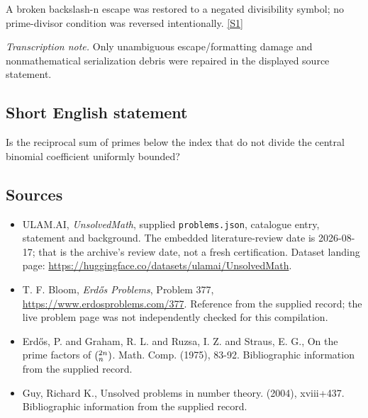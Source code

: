 \documentclass[11pt,a4paper]{article}
\newcommand{\sref}[2]{\hyperlink{source:#1:#2}{[S#2]}}
\begin{document}
A broken backslash-n escape was restored to a negated divisibility symbol; no prime-divisor condition was reversed intentionally. \sref{statement}{1}

{\small\emph{Transcription note.} Only unambiguous escape/formatting damage and nonmathematical serialization debris were repaired in the displayed source statement.}

\subsection{Short English statement}

Is the reciprocal sum of primes below the index that do not divide the central binomial coefficient uniformly bounded?

\subsection{Sources}

{\small

\begin{itemize}

\item[\hypertarget{source:statement:1}{S1}] ULAM.AI, \emph{UnsolvedMath}, supplied \texttt{problems.json}, catalogue entry, statement and background. The embedded literature-review date is 2026-08-17; that is the archive’s review date, not a fresh certification. Dataset landing page: \url{https://huggingface.co/datasets/ulamai/UnsolvedMath}.

\item[\hypertarget{source:statement:2}{S2}] T. F. Bloom, \emph{Erdős Problems}, Problem 377, \url{https://www.erdosproblems.com/377}. Reference from the supplied record; the live problem page was not independently checked for this compilation.

\item[\hypertarget{source:statement:3}{S3}] Erd\H{o}s, P. and Graham, R. L. and Ruzsa, I. Z. and Straus, E. G., On the prime factors of $(\sp{2n}\sb{n})$. Math. Comp. (1975), 83-92. Bibliographic information from the supplied record.

\item[\hypertarget{source:statement:4}{S4}] Guy, Richard K., Unsolved problems in number theory. (2004), xviii+437. Bibliographic information from the supplied record.

\end{itemize}

}

\label{end:statement}
\end{document}
